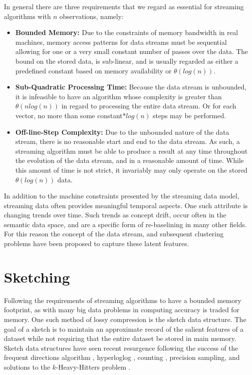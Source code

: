 In general there are three requirements that we regard as essential for streaming algorithms with $n$ observations, 
namely:
\begin{itemize}
 \item \textbf{Bounded Memory:} Due to the constraints of memory bandwidth in real machines, memory access patterns for
   data streams must be sequential allowing for one or a very small constant number of passes over the data.  The bound
   on the stored data, is sub-linear, and is usually regarded as either a predefined constant based on memory
   availability or $\theta(log(n))$.
 \item \textbf{Sub-Quadratic Processing Time:} Because the data stream is unbounded, it is infeasible to have an algorithm
   whose complexity is greater than $\theta(nlog(n))$ in regard to processing the entire data stream.  Or for each
   vector, no more than some constant$*log(n)$ steps may be performed.
 \item \textbf{Off-line-Step Complexity:} Due to the unbounded nature of the data stream, there is no reasonable start
   and end to the data stream.  As such, a streaming algorithm must be able to produce a result at any time throughout
   the evolution of the data stream, and in a reasonable amount of time.  While this amount of time is not strict, it
   invariably may only operate on the stored $\theta(log(n))$ data.
\end{itemize}

\noindent
In addition to the machine constraints presented by the streaming data model, streaming data often provides meaningful
temporal aspects.  One such attribute is changing trends over time.  Such trends as concept drift, occur often in the
semantic data space, and are a specific form of re-baselining in many other fields.  For this reason the concept of the
data stream, and subsequent clustering problems have been proposed \cite{silva-13} to capture these latent features.

\section{Sketching}

Following the requirements of streaming algorithms to have a bounded memory footprint, as with many big data problems in
computing accuracy is traded for memory.  One such method of lossy compression is the sketch data structure. The goal of
a sketch is to maintain an approximate record of the salient features of a dataset while not requiring that the entire
dataset be stored in main memory.  Sketch data structures have seen recent resurgence following the success of the
frequent directions algorithm \cite{libertyfreq}, hyperloglog \cite{hyperloglog}, counting \cite{cormode}, precision
sampling, and solutions to the $k$-Heavy-Hitters problem \cite{berinde}.

